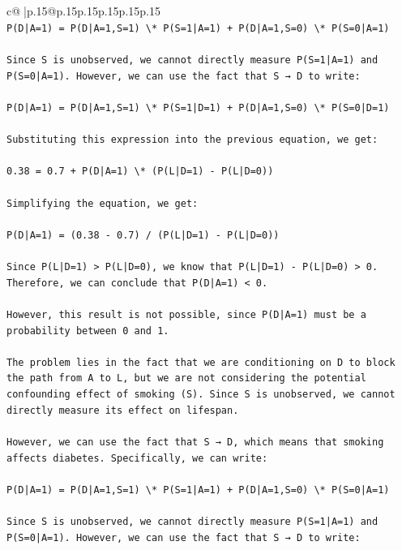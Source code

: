 \documentclass{article}
\begin{document}
{\begin{supertabular}{c@{$\;$}|p{.15\linewidth}@{}p{.15\linewidth}p{.15\linewidth}p{.15\linewidth}p{.15\linewidth}p{.15\linewidth}}
{{{\\ 
\texttt{P(D|A=1) = P(D|A=1,S=1) \textbackslash{}* P(S=1|A=1) + P(D|A=1,S=0) \textbackslash{}* P(S=0|A=1)} \\
\\ 
\texttt{Since S is unobserved, we cannot directly measure P(S=1|A=1) and P(S=0|A=1). However, we can use the fact that S → D to write:} \\
\\ 
\texttt{P(D|A=1) = P(D|A=1,S=1) \textbackslash{}* P(S=1|D=1) + P(D|A=1,S=0) \textbackslash{}* P(S=0|D=1)} \\
\\ 
\texttt{Substituting this expression into the previous equation, we get:} \\
\\ 
\texttt{0.38 = 0.7 + P(D|A=1) \textbackslash{}* (P(L|D=1) {-} P(L|D=0))} \\
\\ 
\texttt{Simplifying the equation, we get:} \\
\\ 
\texttt{P(D|A=1) = (0.38 {-} 0.7) / (P(L|D=1) {-} P(L|D=0))} \\
\\ 
\texttt{Since P(L|D=1) > P(L|D=0), we know that P(L|D=1) {-} P(L|D=0) > 0. Therefore, we can conclude that P(D|A=1) < 0.} \\
\\ 
\texttt{However, this result is not possible, since P(D|A=1) must be a probability between 0 and 1.} \\
\\ 
\texttt{The problem lies in the fact that we are conditioning on D to block the path from A to L, but we are not considering the potential confounding effect of smoking (S). Since S is unobserved, we cannot directly measure its effect on lifespan.} \\
\\ 
\texttt{However, we can use the fact that S → D, which means that smoking affects diabetes. Specifically, we can write:} \\
\\ 
\texttt{P(D|A=1) = P(D|A=1,S=1) \textbackslash{}* P(S=1|A=1) + P(D|A=1,S=0) \textbackslash{}* P(S=0|A=1)} \\
\\ 
\texttt{Since S is unobserved, we cannot directly measure P(S=1|A=1) and P(S=0|A=1). However, we can use the fact that S → D to write:} \\
\\ 
}}}
\end{supertabular}}
\end{document}
